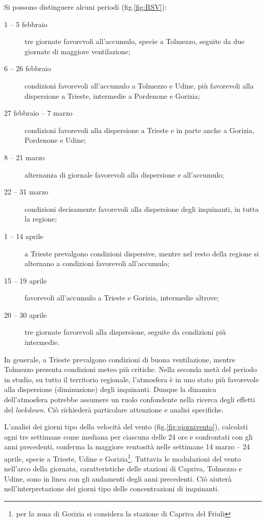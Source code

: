 Si possono distinguere alcuni periodi (fig.\ref{fig:RSV}): 
\begin{description}
    \item [1 -- 5 febbraio] tre giornate favorevoli all'accumulo, specie a Tolmezzo, seguite da due giornate di maggiore ventilazione;
    \item [6 -- 26 febbraio] condizioni favorevoli all'accumulo a Tolmezzo e Udine, più favorevoli alla dispersione a Trieste, intermedie a Pordenone e Gorizia;
    \item [27 febbraio -- 7 marzo] condizioni favorevoli alla dispersione a Trieste e in parte anche a Gorizia, Pordenone e Udine;
    \item [8 -- 21 marzo] alternanza di giornale favorevoli alla dispersione e all'accumulo;
    \item [22 -- 31 marzo] condizioni decisamente favorevoli alla dispersione degli inquinanti, in tutta la regione;
    \item [1 -- 14 aprile] a Trieste prevalgono condizioni dispersive, mentre nel resto della regione si alternano a condizioni favorevoli all'accumulo;
    \item [15 -- 19 aprile] favorevoli all'accumulo a Trieste e Gorizia, intermedie altrove;
    \item [20 -- 30 aprile] tre giornate favorevoli alla dispersione, seguite da condizioni più intermedie.
\end{description}

In generale, a Trieste prevalgono condizioni di buona ventilazione, mentre Tolmezzo presenta condizioni meteo più critiche. Nella seconda metà del periodo in studio, su tutto il territorio regionale, l’atmosfera è in uno stato più favorevole alla dispersione (diminuzione) degli inquinanti. Dunque la dinamica dell'atmosfera potrebbe assumere un ruolo confondente nella ricerca degli effetti del \textit{lockdown}. Ciò richiederà particolare attenzione e analisi specifiche.

L'analisi dei giorni tipo della velocità del vento (fig.\ref{fig:giornivento}), calcolati ogni tre settimane come mediana per ciascuna delle 24 ore e confrontati con gli anni precedenti, conferma la maggiore ventosità nelle settimane 14 marzo -- 24 aprile, specie a Trieste, Udine e Gorizia\footnote{per la zona di Gorizia si considera la stazione di Capriva del Friuli}. Tuttavia le modulazioni del vento nell'arco della giornata, caratteristiche delle stazioni di Capriva, Tolmezzo e Udine, sono in linea con gli andamenti degli anni precedenti. Ciò aiuterà nell'interpretazione dei giorni tipo delle concentrazioni di inquinanti.

